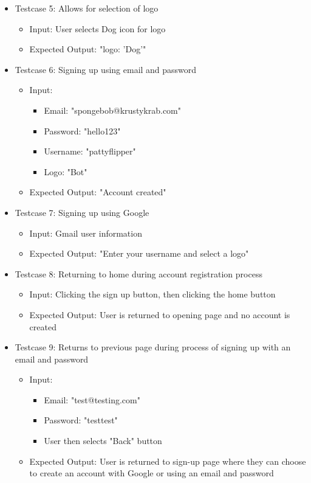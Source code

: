 \begin{itemize}
    \item Testcase 5: Allows for selection of logo
    \begin{itemize}
        \item Input: User selects Dog icon for logo
        \item Expected Output: "logo: 'Dog'"
    \end{itemize}

    \item Testcase 6: Signing up using email and password
    \begin{itemize}
        \item Input: 
            \begin{itemize}
                \item Email: "spongebob@krustykrab.com"
                \item Password: "hello123"
                \item Username: "pattyflipper"
                \item Logo: "Bot"
            \end{itemize}
        \item Expected Output: "Account created"
    \end{itemize}

    \item Testcase 7: Signing up using Google
    \begin{itemize}
        \item Input: Gmail user information
        \item Expected Output: "Enter your username and select a logo"
    \end{itemize}

    \item Testcase 8: Returning to home during account registration process
    \begin{itemize}
        \item Input: Clicking the sign up button, then clicking the home button
        \item Expected Output: User is returned to opening page and no account is created
    \end{itemize}

    \item Testcase 9: Returns to previous page during process of signing up with an email and password
    \begin{itemize}
        \item Input: 
            \begin{itemize}
                \item Email: "test@testing.com"
                \item Password: "testtest"
                \item User then selects "Back" button
            \end{itemize}
        \item Expected Output: User is returned to sign-up page where they can choose to create an account with Google or using an email and password
    \end{itemize}
\end{itemize}

